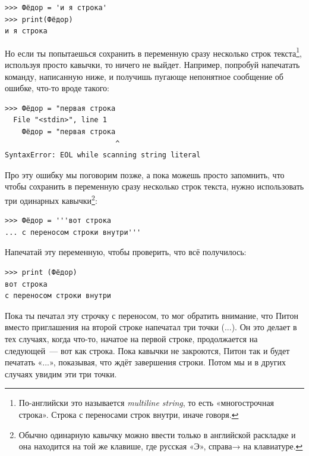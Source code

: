 \begin{listing}
\begin{verbatim}
>>> Фёдор = 'и я строка'
>>> print(Фёдор)
и я строка
\end{verbatim}
\end{listing}

Но если ты попытаешься сохранить в переменную сразу несколько строк текста\footnote{По-английски это называется \emph{multiline string}, то есть «многострочная строка». Строка с переносами строк внутри, иначе говоря.}, используя просто кавычки, то ничего не выйдет. Например, попробуй напечатать команду, написанную ниже, и получишь пугающе непонятное сообщение об ошибке, что-то вроде такого:

\begin{listing}
\begin{verbatim}
>>> Фёдор = "первая строка
  File "<stdin>", line 1
    Фёдор = "первая строка
                          ^
SyntaxError: EOL while scanning string literal
\end{verbatim}
\end{listing}

Про эту ошибку мы поговорим позже, а пока можешь просто запомнить, что чтобы сохранить в переменную сразу несколько строк текста, нужно использовать три одинарных кавычки\footnote{Обычно одинарную кавычку можно ввести только в английской раскладке и она находится на той же клавише, где русская «Э», справа→ на клавиатуре.}:

\begin{listing}
\begin{verbatim}
>>> Фёдор = '''вот строка
... с переносом строки внутри'''
\end{verbatim}
\end{listing}

Напечатай эту переменную, чтобы проверить, что всё получилось:

\begin{listing}
\begin{verbatim}
>>> print (Фёдор)
вот строка
с переносом строки внутри
\end{verbatim}
\end{listing}

Пока ты печатал эту строчку с переносом, то мог обратить внимание, что Питон вместо приглашения на второй строке напечатал три точки (...). Он это делает в тех случаях, когда что-то, начатое на первой строке, продолжается на следующей — вот как строка. Пока кавычки не закроются, Питон так и будет печатать «...», показывая, что ждёт завершения строки. Потом мы и в других случаях увидим эти три точки.

